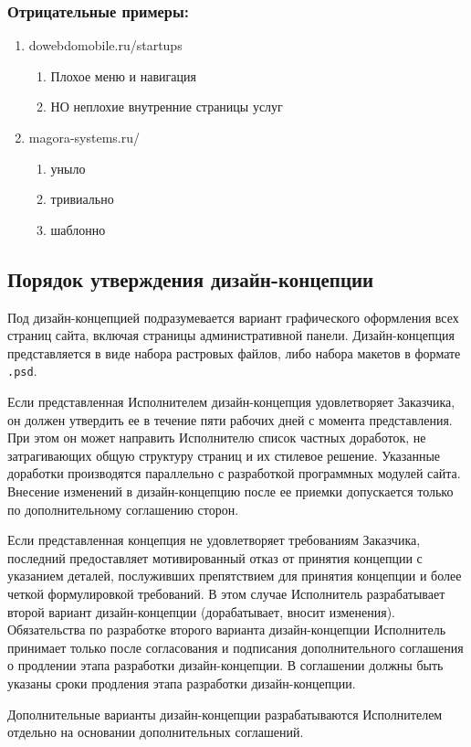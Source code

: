 \subsubsection{Отрицательные примеры:}
\begin{enumerate}
  \item dowebdomobile.ru/startups
  \begin{enumerate}
    \item Плохое меню и навигация
    \item НО неплохие внутренние страницы услуг
  \end{enumerate}

  \item magora-systems.ru/
  \begin{enumerate}
    \item уныло
    \item тривиально
    \item шаблонно
  \end{enumerate}
\end{enumerate}

\subsection{Порядок утверждения дизайн-концепции}
Под дизайн-концепцией подразумевается вариант графического оформления всех страниц сайта, включая страницы административной панели. Дизайн-концепция представляется в виде набора растровых файлов, либо набора макетов в формате \texttt{.psd}.

Если представленная Исполнителем дизайн-концепция удовлетворяет Заказчика, он должен утвердить ее в течение пяти рабочих дней с момента представления. При этом он может направить Исполнителю список частных доработок, не затрагивающих общую структуру страниц и их стилевое решение. Указанные доработки производятся параллельно с разработкой программных модулей сайта. Внесение изменений в дизайн-концепцию после ее приемки допускается только по дополнительному соглашению сторон.

Если представленная концепция не удовлетворяет требованиям Заказчика, последний предоставляет мотивированный отказ от принятия концепции с указанием деталей, послуживших препятствием для принятия концепции и более четкой формулировкой требований. В этом случае Исполнитель разрабатывает второй вариант дизайн-концепции (дорабатывает, вносит изменения). Обязательства по разработке второго варианта дизайн-концепции Исполнитель принимает только после согласования и подписания дополнительного соглашения о продлении этапа разработки дизайн-концепции. В соглашении должны быть указаны сроки продления этапа разработки дизайн-концепции.

Дополнительные варианты дизайн-концепции разрабатываются Исполнителем отдельно на основании дополнительных соглашений.
